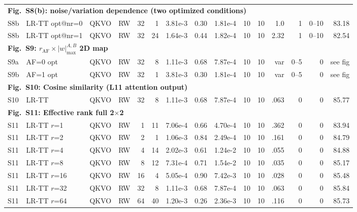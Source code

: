 \documentclass[fleqn,10pt]{wlscirep}
\newcommand{\SIEndSection}{\FloatBarrier\clearpage}
\begin{document}
{\begin{longtable}{@{}l l l l r r r r r r r r r r r@{}}
\multicolumn{15}{l}{\cellcolor{HeadGray}\textbf{Fig.~S8(b): noise/variation dependence (two optimized conditions)}} \\
S8b & LR-TT opt@nr=0 & QKVO & RW & 32 & 1 & 3.81e-3 & 0.30 & 1.81e-4 & 10 & 10 & 1.0 & 1 & 0--10 & 83.18 \\
S8b & LR-TT opt@nr=1 & QKVO & RW & 32 & 24 & 1.64e-3 & 0.44 & 1.82e-4 & 10 & 10 & 2.32 & 1 & 0--10 & 82.54 \\
\midrule

\multicolumn{15}{l}{\cellcolor{HeadGray}\textbf{Fig.~S9: $r_{\mathrm{AF}} \times |w|_{\max}^{A,B}$ 2D map}} \\
S9a & AF=0 opt & QKVO & RW & 32 & 8 & 1.11e-3 & 0.68 & 7.87e-4 & 10 & 10 & var & 0--5 & 0 & see fig \\
S9b & AF=1 opt & QKVO & RW & 32 & 1 & 3.81e-3 & 0.30 & 1.81e-4 & 10 & 10 & var & 0--5 & 0 & see fig \\
\midrule

\multicolumn{15}{l}{\cellcolor{HeadGray}\textbf{Fig.~S10: Cosine similarity (L11 attention output)}} \\
S10 & LR-TT & QKVO & RW & 32 & 8 & 1.11e-3 & 0.68 & 7.87e-4 & 10 & 10 & .063 & 0 & 0 & 85.77 \\
\midrule

\multicolumn{15}{l}{\cellcolor{HeadGray}\textbf{Fig.~S11: Effective rank full 2$\times$2}} \\
S11 & LR-TT $r$=1 & QKVO & RW & 1 & 11 & 7.06e-4 & 0.66 & 4.70e-4 & 10 & 10 & .362 & 0 & 0 & 83.94 \\
S11 & LR-TT $r$=2 & QKVO & RW & 2 & 1 & 1.06e-3 & 0.84 & 2.49e-4 & 10 & 10 & .161 & 0 & 0 & 84.79 \\
S11 & LR-TT $r$=4 & QKVO & RW & 4 & 14 & 2.02e-3 & 0.61 & 1.24e-2 & 10 & 10 & .055 & 0 & 0 & 84.88 \\
S11 & LR-TT $r$=8 & QKVO & RW & 8 & 12 & 7.31e-4 & 0.71 & 1.54e-2 & 10 & 10 & .035 & 0 & 0 & 85.17 \\
S11 & LR-TT $r$=16 & QKVO & RW & 16 & 4 & 5.05e-4 & 0.90 & 7.42e-3 & 10 & 10 & .028 & 0 & 0 & 85.48 \\
S11 & LR-TT $r$=32 & QKVO & RW & 32 & 8 & 1.11e-3 & 0.68 & 7.87e-4 & 10 & 10 & .063 & 0 & 0 & 85.84 \\
S11 & LR-TT $r$=64 & QKVO & RW & 64 & 40 & 1.20e-3 & 0.26 & 2.36e-3 & 10 & 10 & .116 & 0 & 0 & 85.73 \\

\end{longtable}
}

\SIEndSection
\renewcommand{\arraystretch}{1.10}
\end{document}
